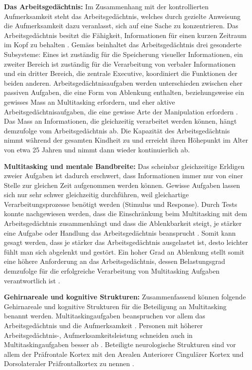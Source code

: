\par
\textbf{Das Arbeitsgedächtnis:} Im Zusammenhang mit der kontrollierten Aufmerksamkeit steht das Arbeitsgedächtnis, welches durch gezielte Anweisung die Aufmerksamkeit dazu veranlasst, sich auf eine Sache zu konzentrieren. Das Arbeitsgedächtnis besitzt die Fähigkeit, Informationen für einen kurzen Zeitraum im Kopf zu behalten \cite{Klingberg2008}. Gemäss  beinhaltet das Arbeitsgedächtnis drei gesonderte Subsysteme: Eines ist zuständig für die Speicherung visueller Informationen, ein zweiter Bereich ist zuständig für die Verarbeitung von verbaler Informationen und ein dritter Bereich, die zentrale Executive, koordiniert die Funktionen der beiden anderen. Arbeitsgedächtnisaufgaben werden unterschieden zwischen eher passiven Aufgaben, die eine Form von Ablenkung enthalten, beziehungsweise ein gewisses Mass an Multitasking erfordern, und eher aktive Arbeitsgedächtnisaufgaben, die eine gewisse Arte der Manipulation erfordern \cite{Klingberg2008}. Das Mass an Informationen, die gleichzeitig verarbeitet werden können, hängt demzufolge vom Arbeitsgedächtnis ab. Die Kapazität des Arbeitsgedächtnis nimmt während der gesamten Kindheit zu und erreicht ihren Höhepunkt im Alter von etwa 25 Jahren und nimmt dann wieder kontinuierlich ab\cite{Swanson1999}.
\par  
\textbf{Multitasking und mentale Bandbreite:} Das scheinbar gleichzeitige Erldigen zweier Aufgaben ist dadurch erschwert, dass Informationen immer nur von einer Stelle zur gleichen Zeit aufgenommen werden können. Gewisse Aufgaben lassen sich nur sehr schwer gleichzeitig durchführen, weil gleichartige Verarbeitungsprozesse  benötigt werden (Stimulus und Response)\cite{Klingberg2008}. Durch Tests konnte nachgewiesen werden, dass die Einschränkung beim Multitasking mit dem Arbeitsgedächtnis zusammenhängt und dass die Ablenkbarkeit steigt, je stärker eine Aufgabe oder Handlung das Arbeitsgedächtnis beansprucht \cite{Lavie2005}. Somit kann gesagt werden, dass je stärker das Arbeitsgedächtnis ausgelastet ist, desto leichter fühlt man sich abgelenkt und gestört. Ein hoher Grad an Ablenkung stellt somit eine höhere Anforderung an das Arbeitsgedächtnis, dessen Belastungsgrad demzufolge für die erfolgreiche Verarbeitung von Multitasking Aufgaben verantwortlich ist \cite{Klingberg2008}.
\par  
\textbf{Gehirnareale und kognitive Strukturen:} Zusammenfassend können folgende Gehirnareale und kognitive Strukturen für die Beteiligung an Multitasking benannt werden. Multitaskingaufgaben beanspruchen vor allem das Arbeitsgedächtnis und die Aufmerksamkeit \cite{Baethge2013}. Personen mit höherer Arbeitsgedächtnis-, Aufmerksamkeitsleistung schneiden auch in Multitaskingaufgaben besser ab \cite{Buhner2006}. Beteiligte neurologische Strukturen sind vor allem der Präfrontale Kortex mit den Arealen Anteriorer Cingulärer Kortex und Dorsolateraler Präfrontalkortex zu nennen \cite{Dreher2003}.
